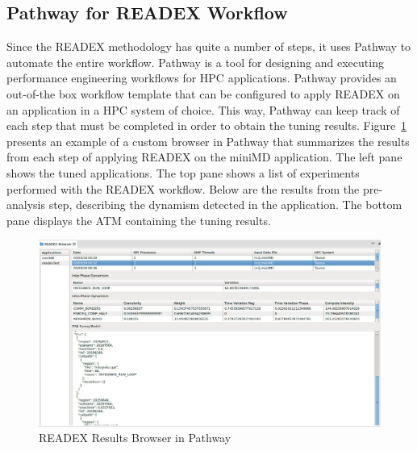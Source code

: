 \subsection{Pathway for READEX Workflow}
\label{sec:pathway_for_readex_workflow}

Since the READEX methodology has quite a number of steps, it uses Pathway to automate the entire workflow. Pathway \cite{Pathway:Petkov13} is a tool for designing and executing performance engineering workflows for HPC applications. Pathway provides an out-of-the box workflow template that can be configured to apply READEX on an application in a HPC system of choice. This way, Pathway can keep track of each step that must be completed in order to obtain the tuning results. Figure~\ref{fig:pathway_browser} presents an example of a custom browser in Pathway that summarizes the results from each step of applying READEX on the miniMD application. The left pane shows the tuned applications. The top pane shows a list of experiments performed with the READEX workflow. Below are the results from the pre-analysis step, describing the dynamism detected in the application. The bottom pane displays the ATM containing the tuning results.


\begin{figure}[!t]
\centering
\includegraphics[width=.95\columnwidth]{figures/PathwayBrowser.jpeg}
\caption{READEX Results Browser in Pathway}
\label{fig:pathway_browser}
\end{figure}
